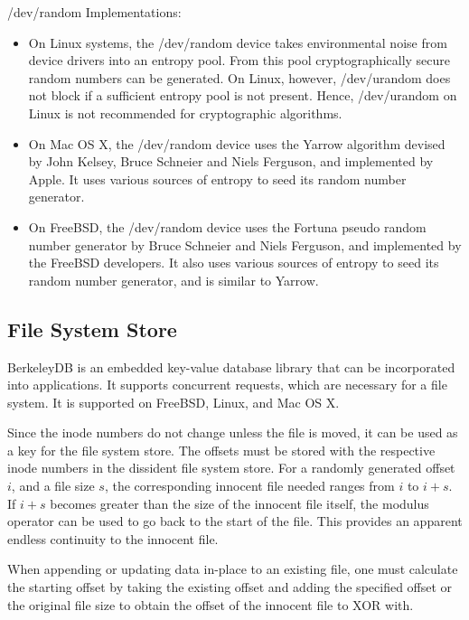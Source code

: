 \documentclass[10pt,onecolumn]{article}
\begin{document}
/dev/random Implementations: 
\begin{itemize}
\item On Linux systems, the /dev/random device takes environmental noise from device drivers into an entropy pool. From this pool cryptographically secure random numbers can be generated.  On Linux, however, /dev/urandom does not block if a sufficient entropy pool is not present. Hence, /dev/urandom on Linux is not recommended for cryptographic algorithms. 
\item On Mac OS X, the /dev/random device uses the Yarrow algorithm devised by John Kelsey, Bruce Schneier and Niels Ferguson, and implemented by Apple. It uses various sources of entropy to seed its random number generator. 
\item On FreeBSD, the /dev/random device uses the Fortuna pseudo random number generator by Bruce Schneier and Niels Ferguson, and implemented by the FreeBSD developers. It also uses various sources of entropy to seed its random number generator, and is similar to Yarrow. 
\end{itemize}

\subsection{File System Store}

BerkeleyDB is an embedded key-value database library that can be incorporated into applications. It supports concurrent requests, which are necessary for a file system. It is supported on FreeBSD, Linux, and Mac OS X. 

Since the inode numbers do not change unless the file is moved, it can be used as a key for the file system store. The offsets must be stored with the respective inode numbers in the dissident file system store. For a randomly generated offset $i$, and a file size $s$, the corresponding innocent file needed ranges from $i$ to $i + s$. If $i + s$ becomes greater than the size of the innocent file itself, the modulus operator can be used to go back to the start of the file. This provides an apparent endless continuity to the innocent file. 

When appending or updating data in-place to an existing file, one must calculate the starting offset by taking the existing offset and adding the specified offset or the original file size to obtain the offset of the innocent file to XOR with. 

\end{document}

